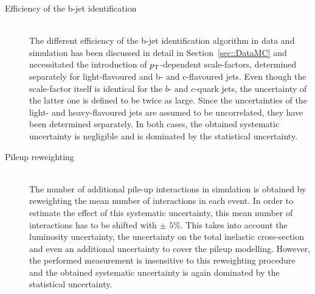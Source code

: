 \begin{myindentpar}
\begin{description}
    \item[Efficiency of the b-jet identification] \hfill \\   %
    The different efficiency of the b-jet identification algorithm in data and simulation has been discussed in detail in Section~\ref{sec::DataMC} and necessitated the introduction of $p_{\rm T}$-dependent scale-factors, determined separately for light-flavoured and b- and c-flavoured jets.
    Even though the scale-factor itself is identical for the $b$- and $c$-quark jets, the uncertainty of the latter one is defined to be twice as large. 
    Since the uncertainties of the light- and heavy-flavoured jets are assumed to be uncorrelated, they have been determined separately.
    In both cases, the obtained systematic uncertainty is negligible and is dominated by the statistical uncertainty.
    
    \item[Pileup reweighting] \hfill \\
    The number of additional pile-up interactions in simulation is obtained by reweighting the mean number of interactions in each event. 
    In order to estimate the effect of this systematic uncertainty, this mean number of interactions has to be shifted with $\pm$ $5\%$.  
    This takes into account the luminosity uncertainty, the uncertainty on the total inelastic cross-section and even an additional uncertainty to cover the pileup modelling.
    However, the performed measurement is insensitive to this reweighting procedure and the obtained systematic uncertainty is again dominated by the statistical uncertainty.
        

\end{description}
\end{myindentpar}
